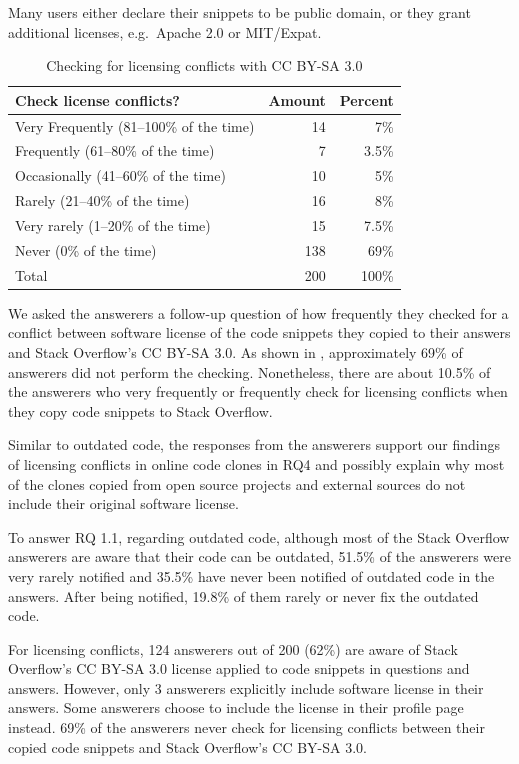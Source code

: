 \documentclass[10pt,journal,compsoc]{IEEEtran}
\newenvironment{boxquote}{\vspace{-1ex}\setlength{\FrameSep}{1\fboxsep}\begin{framed}\setlength{\parskip}{0.5\baselineskip}\setlength{\parindent}{0pt}}{\end{framed}}
\begin{document}
Many users either declare their snippets to be public domain, or they grant
additional licenses, e.g.\ Apache 2.0 or MIT/Expat.

\begin{table}
	\centering
	\caption{Checking for licensing conflicts with CC BY-SA 3.0}
	\label{tab:survey_license_check}
	\begin{tabular}{lrr}
		\toprule
		Check license conflicts? & Amount & Percent \\
		\midrule
		Very Frequently (81--100\% of the time)	& 14 & 7\% \\
		Frequently (61--80\% of the time) & 7 & 3.5\% \\
		Occasionally (41--60\% of the time) & 10 & 5\% \\
		Rarely (21--40\% of the time) & 16 & 8\% \\
		Very rarely (1--20\% of the time) & 15 & 7.5\% \\
		Never (0\% of the time) & 138 & 69\% \\
		\midrule
		Total & 200 & 100\% \\
		\bottomrule
	\end{tabular}
\end{table}

We asked the answerers a follow-up question of how frequently they checked for a
conflict between software license of the code snippets they copied to their
answers and Stack Overflow's CC BY-SA 3.0. As shown in
, approximately 69\% of answerers did not perform
the checking. Nonetheless, there are about 10.5\% of the answerers who very
frequently or frequently check for licensing conflicts when they copy code
snippets to Stack Overflow.

Similar to outdated code, the responses from the answerers support our findings
of licensing conflicts in online code clones in RQ4 and possibly explain why most of
the clones copied from open source projects and external sources do not include
their original software license.

\begin{boxquote}
	To answer RQ 1.1, regarding outdated code, although most of the Stack Overflow answerers are aware that their code
	can be outdated, 51.5\% of the answerers were very rarely notified and 35.5\% have never been notified of
	outdated code in the answers. After being notified, 19.8\% of them rarely or never fix the outdated code.
	
	For licensing conflicts, 124 answerers out of 200 (62\%) are aware of Stack Overflow's
	CC BY-SA 3.0 license applied to code snippets in questions and answers. However,
	only 3 answerers explicitly include software license in their answers. Some 
	answerers choose to include the license in their profile page instead. 69\% of the
	answerers never check for licensing conflicts between their copied code snippets
	and Stack Overflow's CC BY-SA 3.0.
\end{boxquote}
\end{document}
